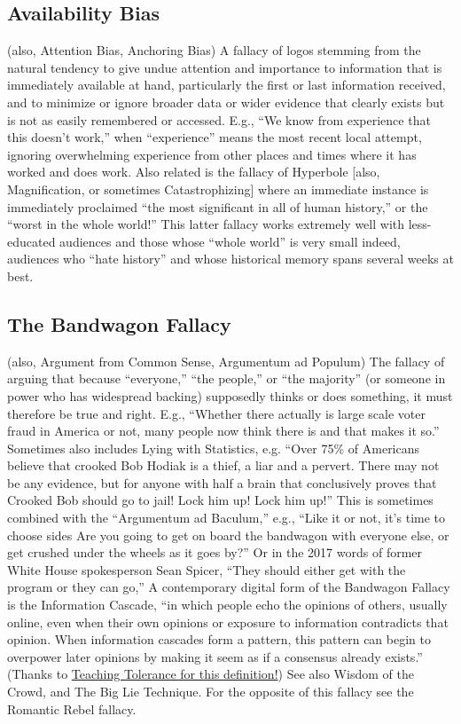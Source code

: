 \documentclass[10pt,a4paper,british]{article}
\begin{document}
\begin{multicols}{2}
	\subsection{Availability Bias} (also, Attention Bias, Anchoring Bias) A fallacy of logos stemming from the natural tendency to give undue attention and importance to information that is immediately available at hand, particularly the first or last information received, and to minimize or ignore broader data or wider evidence that clearly exists but is not as easily remembered or accessed. E.g., ``We know from experience that this doesn't work,'' when ``experience'' means the most recent local attempt, ignoring overwhelming experience from other places and times where it has worked and does work. Also related is the fallacy of Hyperbole [also, Magnification, or sometimes Catastrophizing] where an immediate instance is immediately proclaimed ``the most significant in all of human history,'' or the ``worst in the whole world!'' This latter fallacy works extremely well with less{-}educated audiences and those whose ``whole world'' is very small indeed, audiences who ``hate history'' and whose historical memory spans several weeks at best.  

	\subsection{The Bandwagon Fallacy} (also, Argument from Common Sense, Argumentum ad Populum) The fallacy of arguing that because ``everyone,'' ``the people,'' or ``the majority'' (or someone in power who has widespread backing) supposedly thinks or does something, it must therefore be true and right. E.g., ``Whether there actually is large scale voter fraud in America or not, many people now think there is and that makes it so.'' Sometimes also includes Lying with Statistics, e.g. “Over 75\% of Americans believe that crooked Bob Hodiak is a thief, a liar and a pervert. There may not be any evidence, but for anyone with half a brain that conclusively proves that Crooked Bob should go to jail! Lock him up! Lock him up!” This is sometimes combined with the ``Argumentum ad Baculum,'' e.g., ``Like it or not, it's time to choose sides Are you going to get on board  the bandwagon with everyone else, or get crushed under the wheels as it goes by?'' Or in the 2017 words of former White House spokesperson Sean Spicer, ``They should either get with the program or they can go,'' A contemporary digital form of the Bandwagon Fallacy is the Information Cascade, ``in which people echo the opinions of others, usually online, even when their own opinions or exposure to information contradicts that opinion. When information cascades form a pattern, this pattern can begin to overpower later opinions by making it seem as if a consensus already exists.'' (Thanks to \href{https://www.tolerance.org/magazine/fall-2017/speaking-of-digital-literacy}{Teaching Tolerance for this definition!}) See also Wisdom of the Crowd, and The Big Lie Technique. For the opposite of this fallacy see the Romantic Rebel fallacy.  


\end{multicols}
\end{document}
